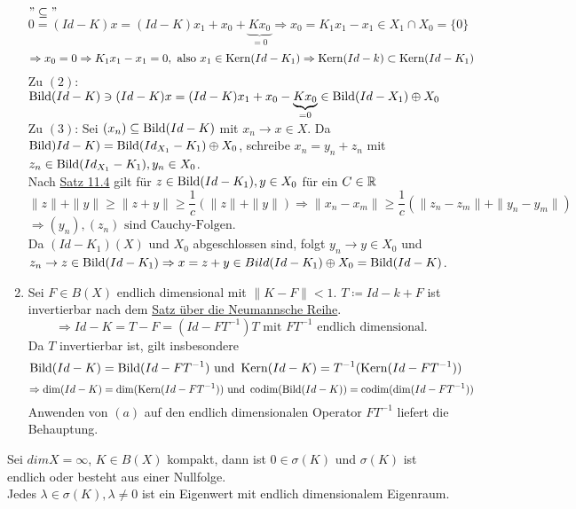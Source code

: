 \begin{beweis}
\begin{enumerate}[label=\alph*\upshape)]
				$"\subseteq"$ $0 = (Id - K) x = (Id - K) x_{1} + x_{0} + \underbrace{K x_{0}}_{= 0} \Rightarrow x_{0} = K_{1} x_{1} - x_{1} \in X_{1} \cap X_{0} = \{ 0 \} $
					\[ \Rightarrow x_{0} = 0 \Rightarrow K_{1} x_{1} - x_{1} = 0, \text{ also } x_{1} \in \mathop{\rm Kern}\nolimits(Id - K_{1}) \Rightarrow \mathop{\rm Kern}\nolimits(Id - k) \subset \mathop{\rm Kern}\nolimits(Id - K_{1}) \]
				Zu $(2)$: $\mathop{\rm Bild}\nolimits(Id - K) \ni (Id - K)x = (Id - K)x_{1} + x_{0} - \underbrace{K x_{0}}_{= 0} \in \mathop{\rm Bild}\nolimits(Id - X_{1}) \oplus X_{0}$ \\
				Zu $(3)$: Sei $(x_{n}) \subseteq \mathop{\rm Bild}\nolimits(Id - K)$ mit $x_{n} \rightarrow x \in X$. Da $\mathop{\rm Bild}\nolimits)Id - K) = \mathop{\rm Bild}\nolimits(Id_{X_{1}} - K_{1}) \oplus X_{0}$, schreibe $x_{n} = y_{n} + z_{n}$ mit $z_{n} \in \mathop{\rm Bild}\nolimits(Id_{X_{1}} - K_{1}), y_{n} \in X_{0}$. \\
				Nach \hyperref[satz:11.4]{Satz 11.4} gilt für $z \in \mathop{\rm Bild}\nolimits(Id - K_{1}), y \in X_{0}$ für ein $C \in \mathbb{R}$
				\[ \| z \| + \| y \| \geq \| z + y \| \geq \frac{1}{c} \left( \| z \| + \| y \| \right) \Rightarrow \| x_{n} - x_{m} \| \geq \frac{1}{c} \left( \| z_{n} - z_{m} \| + \| y_{n} - y_{m} \| \right) \]
				$\Rightarrow (y_{n}), (z_{n}) \text{ sind Cauchy-Folgen}$. \\
				Da $(Id - K_{1})(X)$ und $X_{0}$ abgeschlossen sind, folgt $y_{n} \rightarrow y \in X_{0}$ und $z_{n} \rightarrow z \in \mathop{\rm Bild}\nolimits(Id - K_{1}) \Rightarrow x = z + y \in Bild(Id - K_{1}) \oplus X_{0} = \mathop{\rm Bild}\nolimits(Id - K)$.
			\item Sei $F \in B(X)$ endlich dimensional mit $\| K - F \| < 1$. $T \coloneqq Id - k + F$ ist invertierbar nach dem \hyperref[prop:5.8-NeumannscheReihe]{Satz über die Neumannsche Reihe}.
				\[ \Rightarrow Id - K = T - F = (Id - F T^{-1})T \text{ mit } F T^{-1} \text{ endlich dimensional.} \]
				Da $T$ invertierbar ist, gilt insbesondere
				\[ \mathop{\rm Bild}\nolimits(Id - K) = \mathop{\rm Bild}\nolimits(Id - F T^{-1}) \text{ und } \mathop{\rm Kern}\nolimits(Id - K) = T^{-1}(\mathop{\rm Kern}\nolimits(Id - F T^{-1})) \]
				\[ \Rightarrow \dim(Id - K) = \dim(\mathop{\rm Kern}\nolimits(Id - F T^{-1})) \text{ und } \operatorname{codim}(\mathop{\rm Bild}\nolimits(Id -K)) = \operatorname{codim}(\dim(Id - F T^{-1})) \]
				Anwenden von \hyperref[satz:14.1]{$(a)$} auf den endlich dimensionalen Operator $F T^{-1}$ liefert die Behauptung.
		\end{enumerate}
\end{beweis}


\begin{satz}  \label{satz:14.3}
	Sei $dim X = \infty$, $K \in B(X)$ kompakt, dann ist $0 \in \sigma(K)$ und $\sigma(K)$ ist endlich oder besteht aus einer Nullfolge. \\
	Jedes $\lambda \in \sigma(K), \lambda \neq 0$ ist ein Eigenwert mit endlich dimensionalem Eigenraum.
\end{satz}

